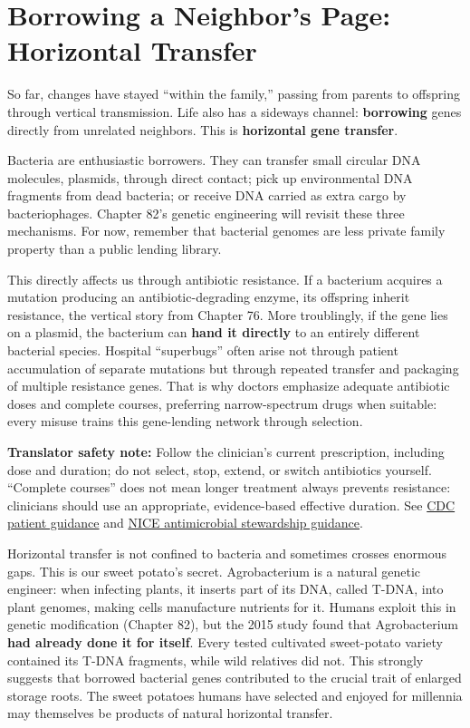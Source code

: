 \section{Borrowing a Neighbor's Page: Horizontal Transfer}

So far, changes have stayed ``within the family,'' passing from parents to offspring through vertical transmission. Life also has a sideways channel: \textbf{borrowing} genes directly from unrelated neighbors. This is \textbf{horizontal gene transfer}.

Bacteria are enthusiastic borrowers. They can transfer small circular DNA molecules, plasmids, through direct contact; pick up environmental DNA fragments from dead bacteria; or receive DNA carried as extra cargo by bacteriophages. Chapter 82's genetic engineering will revisit these three mechanisms. For now, remember that bacterial genomes are less private family property than a public lending library.

This directly affects us through antibiotic resistance. If a bacterium acquires a mutation producing an antibiotic-degrading enzyme, its offspring inherit resistance, the vertical story from Chapter 76. More troublingly, if the gene lies on a plasmid, the bacterium can \textbf{hand it directly} to an entirely different bacterial species. Hospital ``superbugs'' often arise not through patient accumulation of separate mutations but through repeated transfer and packaging of multiple resistance genes. That is why doctors emphasize adequate antibiotic doses and complete courses, preferring narrow-spectrum drugs when suitable: every misuse trains this gene-lending network through selection.

\textbf{Translator safety note:} Follow the clinician's current prescription, including dose and duration; do not select, stop, extend, or switch antibiotics yourself. ``Complete courses'' does not mean longer treatment always prevents resistance: clinicians should use an appropriate, evidence-based effective duration. See \href{https://www.cdc.gov/antibiotic-use/about/}{CDC patient guidance} and \href{https://www.nice.org.uk/guidance/ng15/evidence/full-guideline-pdf-252320799}{NICE antimicrobial stewardship guidance}.

Horizontal transfer is not confined to bacteria and sometimes crosses enormous gaps. This is our sweet potato's secret. Agrobacterium is a natural genetic engineer: when infecting plants, it inserts part of its DNA, called T-DNA, into plant genomes, making cells manufacture nutrients for it. Humans exploit this in genetic modification (Chapter 82), but the 2015 study found that Agrobacterium \textbf{had already done it for itself}. Every tested cultivated sweet-potato variety contained its T-DNA fragments, while wild relatives did not. This strongly suggests that borrowed bacterial genes contributed to the crucial trait of enlarged storage roots. The sweet potatoes humans have selected and enjoyed for millennia may themselves be products of natural horizontal transfer.

